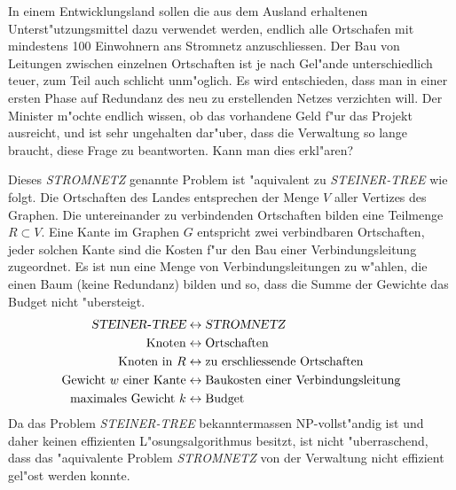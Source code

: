 In einem Entwicklungsland sollen die aus dem Ausland erhaltenen
Unterst"utzungsmittel dazu verwendet werden, endlich alle Ortschafen
mit mindestens 100 Einwohnern ans Stromnetz anzuschliessen.
Der Bau von Leitungen zwischen einzelnen Ortschaften ist je nach
Gel"ande unterschiedlich teuer, zum Teil auch schlicht unm"oglich.
Es wird entschieden, dass man in einer ersten Phase auf Redundanz des
neu zu erstellenden Netzes verzichten will.
Der Minister m"ochte endlich wissen,
ob das vorhandene Geld f"ur das Projekt ausreicht, und ist sehr ungehalten
dar"uber, dass die Verwaltung so lange braucht, diese Frage zu beantworten.
Kann man dies erkl"aren?

\begin{loesung}
Dieses \textsl{STROMNETZ} genannte Problem ist "aquivalent zu
\textsl{STEINER-TREE} wie folgt.
Die Ortschaften des Landes entsprechen der Menge $V$ aller Vertizes des
Graphen. Die untereinander zu verbindenden Ortschaften bilden eine Teilmenge
$R\subset V$.
Eine Kante im Graphen $G$ entspricht zwei verbindbaren Ortschaften,
jeder solchen Kante sind die Kosten f"ur den Bau einer Verbindungsleitung
zugeordnet.
Es ist nun eine Menge von Verbindungsleitungen zu w"ahlen, die einen Baum
(keine Redundanz) bilden und so, dass die Summe der Gewichte das 
Budget nicht "ubersteigt.
\begin{align*}
\textsl{STEINER-TREE}&\leftrightarrow\textsl{STROMNETZ}\\
\text{Knoten}&\leftrightarrow\text{Ortschaften}\\
\text{Knoten in $R$}&\leftrightarrow\text{zu erschliessende Ortschaften}\\
\text{Gewicht $w$ einer Kante}&\leftrightarrow \text{Baukosten einer Verbindungsleitung}\\
\text{maximales Gewicht $k$}&\leftrightarrow\text{Budget}
\end{align*}
Da das Problem \textsl{STEINER-TREE} bekanntermassen NP-vollst"andig ist
und daher keinen effizienten L"osungsalgorithmus besitzt, ist nicht
"uberraschend, dass das "aquivalente Problem \textsl{STROMNETZ} von
der Verwaltung nicht effizient gel"ost werden konnte.
\end{loesung}

